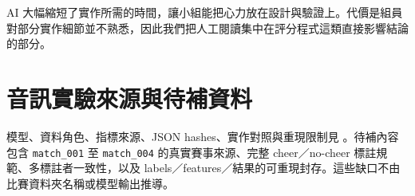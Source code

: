 AI 大幅縮短了實作所需的時間，讓小組能把心力放在設計與驗證上。代價是組員對部分實作細節並不熟悉，因此我們把人工閱讀集中在評分程式這類直接影響結論的部分。

\chapter{音訊實驗來源與待補資料}
\label{app:audio-sources}

模型、資料角色、指標來源、JSON hashes、實作對照與重現限制見 。待補內容包含 \texttt{match\_001} 至 \texttt{match\_004} 的真實賽事來源、完整 cheer／no-cheer 標註規範、多標註者一致性，以及 labels／features／結果的可重現封存。這些缺口不由比賽資料夾名稱或模型輸出推導。
